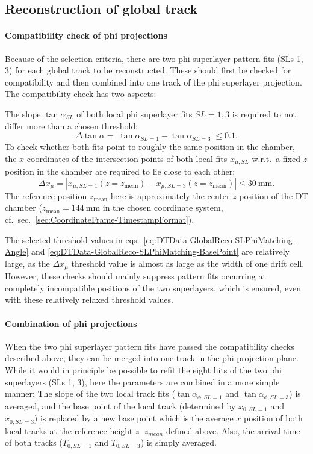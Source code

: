 \subsection{Reconstruction of global track}
\label{sec:DTData-GlobalTrackBuilding-Strategy}
\paragraph{Compatibility check of phi projections}
Because of the selection criteria, there are two phi superlayer pattern fits (\acp{SL} 1, 3) for each global track to be reconstructed. These should first be checked for compatibility and then combined into one track of the phi superlayer projection. The compatibility check has two aspects:
\par The slope $\tan\alpha_{SL}$ of both local phi superlayer fits $SL=1,3$ is required to not differ more than a chosen threshold:
\begin{equation}
    \Delta \tan\alpha = \left| \tan\alpha_{SL=1}  - \tan\alpha_{SL=3} \right| \leq 0.1 .
    \label{eq:DTData-GlobalReco-SLPhiMatching-Angle}
\end{equation}
To check whether both fits point to roughly the same position in the chamber, the $x$ coordinates of the intersection points of both local fits $x_{\mu,SL}$ w.r.t.\ a fixed $z$ position in the chamber are required to lie close to each other:
\begin{equation}
    \Delta x_\mu = \left| x_{\mu,SL=1}(z=z_\text{mean}) - x_{\mu,SL=3}(z=z_\text{mean}) \right| \leq \SI{30}{\milli\meter} .
    \label{eq:DTData-GlobalReco-SLPhiMatching-BasePoint}
\end{equation}
The reference position $z_\text{mean}$ here is approximately the center $z$ position of the \ac{DT} chamber ($z_\text{mean}=\SI{144}{\milli\meter}$ in the chosen coordinate system, cf.\ sec.\ \ref{sec:CoordinateFrame-TimestampFormat}).
\par The selected threshold values in eqs.\ \ref{eq:DTData-GlobalReco-SLPhiMatching-Angle} and \ref{eq:DTData-GlobalReco-SLPhiMatching-BasePoint} are relatively large, as the $\Delta x_\mu$ threshold value is almost as large as the width of one drift cell. However, these checks should mainly suppress pattern fits occurring at completely incompatible positions of the two superlayers, which is ensured, even with these relatively relaxed threshold values.
\paragraph{Combination of phi projections}
When the two phi superlayer pattern fits have passed the compatibility checks described above, they can be merged into one track in the phi projection plane. While it would in principle be possible to refit the eight hits of the two phi superlayers (\acp{SL} 1, 3), here the parameters are combined in a more simple manner: The slope of the two local track fits ($\tan\alpha_{\phi,SL=1}$ and $\tan\alpha_{\phi,SL=3}$) is averaged, and the base point of the local track (determined by $x_{0,SL=1}$ and $x_{0,SL=3}$) is replaced by a new base point which is the average $x$ position of both local tracks at the reference height $z_=z_{mean}$ defined above. Also, the arrival time of both tracks ($T_{0,SL=1}$ and $T_{0,SL=3}$) is simply averaged.
